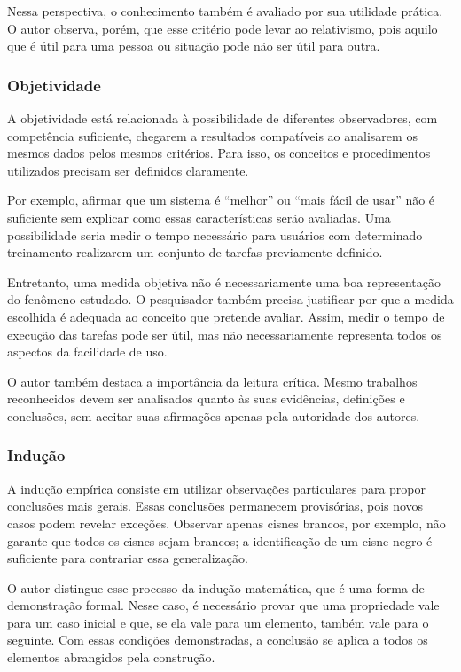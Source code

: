 \documentclass[12pt,a4paper]{article}
\begin{document}
Nessa perspectiva, o conhecimento também é avaliado por sua utilidade prática. O autor observa, porém, que esse critério pode levar ao relativismo, pois aquilo que é útil para uma pessoa ou situação pode não ser útil para outra.

\subsubsection{Objetividade}

A objetividade está relacionada à possibilidade de diferentes observadores, com competência suficiente, chegarem a resultados compatíveis ao analisarem os mesmos dados pelos mesmos critérios. Para isso, os conceitos e procedimentos utilizados precisam ser definidos claramente.

Por exemplo, afirmar que um sistema é ``melhor'' ou ``mais fácil de usar'' não é suficiente sem explicar como essas características serão avaliadas. Uma possibilidade seria medir o tempo necessário para usuários com determinado treinamento realizarem um conjunto de tarefas previamente definido.

Entretanto, uma medida objetiva não é necessariamente uma boa representação do fenômeno estudado. O pesquisador também precisa justificar por que a medida escolhida é adequada ao conceito que pretende avaliar. Assim, medir o tempo de execução das tarefas pode ser útil, mas não necessariamente representa todos os aspectos da facilidade de uso.

O autor também destaca a importância da leitura crítica. Mesmo trabalhos reconhecidos devem ser analisados quanto às suas evidências, definições e conclusões, sem aceitar suas afirmações apenas pela autoridade dos autores.

\subsubsection{Indução}

A indução empírica consiste em utilizar observações particulares para propor conclusões mais gerais. Essas conclusões permanecem provisórias, pois novos casos podem revelar exceções. Observar apenas cisnes brancos, por exemplo, não garante que todos os cisnes sejam brancos; a identificação de um cisne negro é suficiente para contrariar essa generalização.

O autor distingue esse processo da indução matemática, que é uma forma de demonstração formal. Nesse caso, é necessário provar que uma propriedade vale para um caso inicial e que, se ela vale para um elemento, também vale para o seguinte. Com essas condições demonstradas, a conclusão se aplica a todos os elementos abrangidos pela construção.
\end{document}

